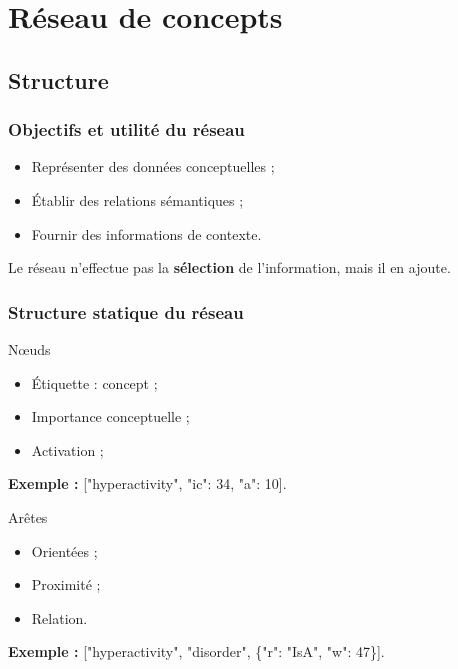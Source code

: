 \documentclass[12pt, handout]{beamer}
\begin{document}
\section{Réseau de concepts}

\subsection{Structure}

\begin{frame}
 \frametitle{Objectifs et utilité du réseau}
 
 \begin{itemize}
  \item Représenter des données conceptuelles ;
  \item Établir des relations sémantiques ;
  \item Fournir des informations de contexte.
 \end{itemize}
 
 Le réseau n'effectue pas la \textbf{sélection} de l'information, mais il en ajoute.
 
\end{frame}


\begin{frame}[allowframebreaks = 0.7, fragile]
 \frametitle{Structure statique du réseau}
 
\begin{block}{N\oe uds}
\begin{itemize}
 \item Étiquette : concept ;
 \item Importance conceptuelle ;
 \item Activation ;
\end{itemize}

\textbf{Exemple :} ["hyperactivity", "ic": 34, "a": 10].

\end{block}
 
\begin{block}{Arêtes}
 \begin{itemize}
  \item Orientées ;
  \item Proximité ;
  \item Relation.
 \end{itemize}

\textbf{Exemple :} ["hyperactivity", "disorder", \{"r": "IsA", "w": 47\}].
 
\end{block}

 
\end{frame}
\end{document}
